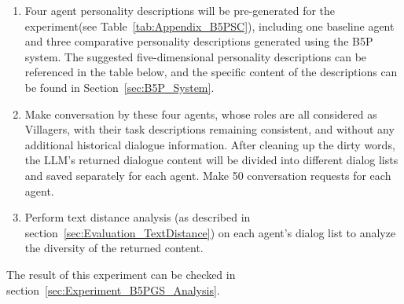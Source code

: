 \begin{enumerate}
   
    \item  Four agent personality descriptions will be pre-generated for the experiment(see Table~\ref{tab:Appendix_B5PSC}), including one baseline agent and three comparative personality descriptions generated using the B5P system. The suggested five-dimensional personality descriptions can be referenced in the table below, and the specific content of the descriptions can be found in Section~\ref{sec:B5P_System}.

    \item  Make conversation by these four agents, whose roles are all considered as Villagers, with their task descriptions remaining consistent, and without any additional historical dialogue information. After cleaning up the dirty words, the LLM's returned dialogue content will be divided into different dialog lists and saved separately for each agent. Make 50 conversation requests for each agent.

    \item Perform text distance analysis (as described in section~\ref{sec:Evaluation_TextDistance}) on each agent's dialog list to analyze the diversity of the returned content.
\end{enumerate}

The result of this experiment can be checked in section~\ref{sec:Experiment_B5PGS_Analysis}.

\begin{table*}[ht]
    \renewcommand{\arraystretch}{1.3}
    \setlength{\tabcolsep}{10pt}
        \centering
    \caption{The level of big five traits used in the experiment
    }
    \label{tab:Appendix_B5PSC}
  \end{table*}